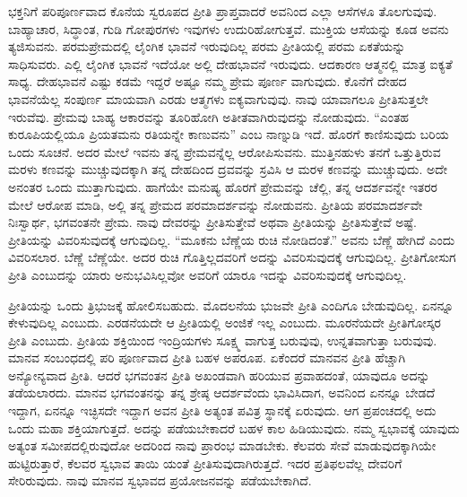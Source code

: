 ಭಕ್ತನಿಗೆ ಪರಿಪೂರ್ಣವಾದ ಕೊನೆಯ ಸ್ವರೂಪದ ಪ್ರೀತಿ ಪ್ರಾಪ್ತವಾದರೆ ಅವನಿಂದ ಎಲ್ಲಾ ಆಸೆಗಳೂ ತೊಲಗುವುವು. ಬಾಹ್ಯಾಚಾರ, ಸಿದ್ಧಾಂತ, ಗುಡಿ ಗೋಪುರಗಳು ಇವುಗಳು ಉದುರಿಹೋಗುತ್ತವೆ. ಮುಕ್ತಿಯ ಆಸೆಯನ್ನು ಕೂಡ ಅವನು ತ್ಯಜಿಸುವನು. ಪರಮಪ್ರೇಮದಲ್ಲಿ ಲೈಂಗಿಕ ಭಾವನೆ ಇರುವುದಿಲ್ಲ ಪರಮ ಪ್ರೀತಿಯಲ್ಲಿ ಪರಮ ಏಕತೆಯನ್ನು ಸಾಧಿಸುವರು. ಎಲ್ಲಿ ಲೈಂಗಿಕ ಭಾವನೆ ಇದೆಯೋ ಅಲ್ಲಿ ದೇಹಭಾವನೆ ಇರುವುದು. ಆದಕಾರಣ ಆತ್ಮನಲ್ಲಿ ಮಾತ್ರ ಐಕ್ಯತೆ ಸಾಧ್ಯ. ದೇಹಭಾವನೆ ಎಷ್ಟು ಕಡಮೆ ಇದ್ದರೆ ಅಷ್ಟೂ ನಮ್ಮ ಪ್ರೇಮ ಪೂರ್ಣ ವಾಗುವುದು. ಕೊನೆಗೆ ದೇಹದ ಭಾವನೆಯೆಲ್ಲ ಸಂಪುರ್ಣ ಮಾಯವಾಗಿ ಎರಡು ಆತ್ಮಗಳು ಐಕ್ಯವಾಗುವುವು. ನಾವು ಯಾವಾಗಲೂ ಪ್ರೀತಿಸುತ್ತಲೇ ಇರುವೆವು. ಪ್ರೇಮವು ಬಾಹ್ಯ ಆಕಾರವನ್ನು ತೂರಿಹೋಗಿ ಅತೀತವಾಗಿರುವುದನ್ನು ನೋಡುವುದು. “ಎಂತಹ ಕುರೂಪಿಯಲ್ಲಿಯೂ ಪ್ರಿಯತಮನು ರತಿಯನ್ನೇ ಕಾಣುವನು” ಎಂಬ ನಾಣ್ನುಡಿ ಇದೆ. ಹೊರಗೆ ಕಾಣಿಸುವುದು ಬರಿಯ ಒಂದು ಸೂಚನೆ. ಅದರ ಮೇಲೆ ಇವನು ತನ್ನ ಪ್ರೇಮವನ್ನೆಲ್ಲ ಆರೋಪಿಸುವನು. ಮುತ್ತಿನಹುಳು ತನಗೆ ಒತ್ತುತ್ತಿರುವ ಮರಳು ಕಣವನ್ನು ಮುಚ್ಚುವುದಕ್ಕಾಗಿ ತನ್ನ ದೇಹದಿಂದ ದ್ರವವನ್ನು ಸ್ರವಿಸಿ ಆ ಮರಳ ಕಣವನ್ನು ಮುಚ್ಚುವುದು. ಅದೇ ಅನಂತರ ಒಂದು ಮುತ್ತಾಗುವುದು. ಹಾಗೆಯೇ ಮನುಷ್ಯ ಹೊರಗೆ ಪ್ರೇಮವನ್ನು ಚೆಲ್ಲಿ, ತನ್ನ ಆದರ್ಶವನ್ನೇ ಇತರರ ಮೇಲೆ ಆರೋಪ ಮಾಡಿ, ಅಲ್ಲಿ ತನ್ನ ಪ್ರೇಮದ ಪರಮಾದರ್ಶವನ್ನು ನೋಡುವನು. ಪ್ರೀತಿಯ ಪರಮಾದರ್ಶವೇ ನಿಃಸ್ವಾರ್ಥ, ಭಗವಂತನೇ ಪ್ರೇಮ. ನಾವು ದೇವರನ್ನು ಪ್ರೀತಿಸುತ್ತೇವೆ ಅಥವಾ ಪ್ರೀತಿಯನ್ನು ಪ್ರೀತಿಸುತ್ತೇವೆ ಅಷ್ಟೆ. ಪ್ರೀತಿಯನ್ನು ವಿವರಿಸುವುದಕ್ಕೆ ಆಗುವುದಿಲ್ಲ. “ಮೂಕನು ಬೆಣ್ಣೆಯ ರುಚಿ ನೋಡಿದಂತೆ.” ಅವನು ಬೆಣ್ಣೆ ಹೇಗಿದೆ ಎಂದು ವಿವರಿಸಲಾರ. ಬೆಣ್ಣೆ ಬೆಣ್ಣೆಯೇ. ಅದರ ರುಚಿ ಗೊತ್ತಿಲ್ಲದವರಿಗೆ ಅದನ್ನು ವಿವರಿಸುವುದಕ್ಕೆ ಆಗುವುದಿಲ್ಲ. ಪ್ರೀತಿಗೋಸುಗ ಪ್ರೀತಿ ಎಂಬುದನ್ನು ಯಾರು ಅನುಭವಿಸಿಲ್ಲವೋ ಅವರಿಗೆ ಯಾರೂ ಇದನ್ನು ವಿವರಿಸುವುದಕ್ಕೆ ಆಗುವುದಿಲ್ಲ.

ಪ್ರೀತಿಯನ್ನು ಒಂದು ತ್ರಿಭುಜಕ್ಕೆ ಹೋಲಿಸಬಹುದು. ಮೊದಲನೆಯ ಭುಜವೇ ಪ್ರೀತಿ ಎಂದಿಗೂ ಬೇಡುವುದಿಲ್ಲ. ಏನನ್ನೂ ಕೇಳುವುದಿಲ್ಲ ಎಂಬುದು. ಎರಡನೆಯದೇ ಆ ಪ್ರೀತಿಯಲ್ಲಿ ಅಂಜಿಕೆ ಇಲ್ಲ ಎಂಬುದು. ಮೂರನೆಯದೇ ಪ್ರೀತಿಗೋಸ್ಕರ ಪ್ರೀತಿ ಎಂಬುದು. ಪ್ರೀತಿಯ ಶಕ್ತಿಯಿಂದ ಇಂದ್ರಿಯಗಳು ಸೂಕ್ಷ್ಮ ವಾಗುತ್ತ ಬರುವುವು, ಉನ್ನತವಾಗುತ್ತಾ ಬರುವುವು. ಮಾನವ ಸಂಬಂಧದಲ್ಲಿ ಪರಿ ಪೂರ್ಣವಾದ ಪ್ರೀತಿ ಬಹಳ ಅಪರೂಪ. ಏಕೆಂದರೆ ಮಾನವನ ಪ್ರೀತಿ ಹೆಚ್ಚಾಗಿ ಅನ್ಯೋನ್ಯವಾದ ಪ್ರೀತಿ. ಆದರೆ ಭಗವಂತನ ಪ್ರೀತಿ ಅಖಂಡವಾಗಿ ಹರಿಯುವ ಪ್ರವಾಹದಂತೆ, ಯಾವುದೂ ಅದನ್ನು ತಡೆಯಲಾರದು. ಮಾನವ ಭಗವಂತನನ್ನು ತನ್ನ ಶ್ರೇಷ್ಠ ಆದರ್ಶವೆಂದು ಭಾವಿಸಿದಾಗ, ಅವನಿಂದ ಏನನ್ನೂ ಬೇಡದೆ ಇದ್ದಾಗ, ಏನನ್ನೂ ಇಚ್ಛಿಸದೇ ಇದ್ದಾಗ ಅವನ ಪ್ರೀತಿ ಅತ್ಯಂತ ಪವಿತ್ರ ಸ್ಥಾನಕ್ಕೆ ಏರುವುದು. ಆಗ ಪ್ರಪಂಚದಲ್ಲಿ ಅದು ಒಂದು ಮಹಾ ಶಕ್ತಿಯಾಗುತ್ತದೆ. ಅದನ್ನು ಪಡೆಯಬೇಕಾದರೆ ಬಹಳ ಕಾಲ ಹಿಡಿಯುವುದು. ನಮ್ಮ ಸ್ವಭಾವಕ್ಕೆ ಯಾವುದು ಅತ್ಯಂತ ಸಮೀಪದಲ್ಲಿರುವುದೋ ಅದರಿಂದ ನಾವು ಪ್ರಾರಂಭ ಮಾಡಬೇಕು. ಕೆಲವರು ಸೇವೆ ಮಾಡುವುದಕ್ಕಾಗಿಯೇ ಹುಟ್ಟಿರುತ್ತಾರೆ, ಕೆಲವರ ಸ್ವಭಾವ ತಾಯಿ ಯಂತೆ ಪ್ರೀತಿಸುವುದಾಗಿರುತ್ತದೆ. ಇದರ ಪ್ರತಿಫಲವೆಲ್ಲ ದೇವರಿಗೆ ಸೇರಿರುವುದು. ನಾವು ಮಾನವ ಸ್ವಭಾವದ ಪ್ರಯೋಜನವನ್ನು ಪಡೆಯಬೇಕಾಗಿದೆ.

